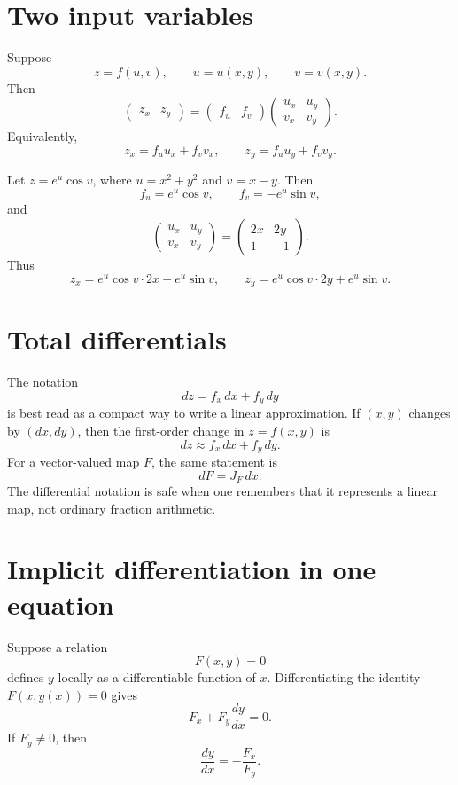 \section{Two input variables}

Suppose
\[
  z=f(u,v),\qquad u=u(x,y),\qquad v=v(x,y).
\]
Then
\[
  \begin{pmatrix}z_x&z_y\end{pmatrix}
  =
  \begin{pmatrix}f_u&f_v\end{pmatrix}
  \begin{pmatrix}
    u_x&u_y\\
    v_x&v_y
  \end{pmatrix}.
\]
Equivalently,
\[
  z_x=f_u u_x+f_v v_x,\qquad
  z_y=f_u u_y+f_v v_y.
\]

\begin{example}
Let \(z=e^u\cos v\), where \(u=x^2+y^2\) and \(v=x-y\).  Then
\[
  f_u=e^u\cos v,\qquad f_v=-e^u\sin v,
\]
and
\[
  \begin{pmatrix}
    u_x&u_y\\ v_x&v_y
  \end{pmatrix}
  =
  \begin{pmatrix}
    2x&2y\\ 1&-1
  \end{pmatrix}.
\]
Thus
\[
  z_x=e^u\cos v\cdot2x-e^u\sin v,
  \qquad
  z_y=e^u\cos v\cdot2y+e^u\sin v.
\]
\end{example}

\section{Total differentials}

The notation
\[
  dz=f_x\,dx+f_y\,dy
\]
is best read as a compact way to write a linear approximation.  If \((x,y)\) changes by \((dx,dy)\), then the first-order change in \(z=f(x,y)\) is
\[
  dz\approx f_x\,dx+f_y\,dy.
\]
For a vector-valued map \(F\), the same statement is
\[
  dF=J_F\,dx.
\]
The differential notation is safe when one remembers that it represents a linear map, not ordinary fraction arithmetic.

\section{Implicit differentiation in one equation}

Suppose a relation
\[
  F(x,y)=0
\]
defines \(y\) locally as a differentiable function of \(x\).  Differentiating the identity \(F(x,y(x))=0\) gives
\[
  F_x+F_y\frac{dy}{dx}=0.
\]
If \(F_y\ne0\), then
\[
  \frac{dy}{dx}=-\frac{F_x}{F_y}.
\]

